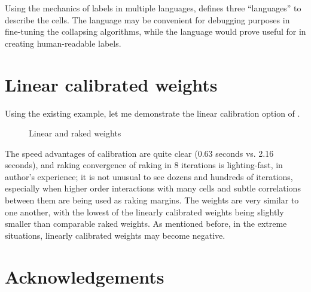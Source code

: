 Using the mechanics of labels in multiple languages,  defines three
``languages'' to describe the cells. The language  may be convenient
for debugging purposes in fine-tuning the collapsing algorithms, while the language
 would prove useful for  in creating human-readable
labels.

\section{Linear calibrated weights}
\label{subsec:linear}

Using the existing example, let me demonstrate the linear calibration option of
.

\begin{stlog}
\nullskip
\end{stlog}

\begin{figure}[h!]
    \begin{center}
    \end{center}
    \caption{Linear and raked weights}
    \label{fig:linear:raked}
\end{figure}

The speed advantages of  calibration are quite clear (0.63 seconds vs. 2.16 seconds), 
and raking convergence of raking in 8 iterations is lighting-fast, in author's experience;
it is not unusual to see dozens and hundreds of iterations, especially when higher order 
interactions with many cells and subtle correlations between them are being used as
raking margins.
The weights are very similar to one another, with the lowest of the linearly
calibrated weights being slightly smaller than comparable raked weights.
As mentioned before, in the extreme situations, linearly calibrated weights
may become negative.


















\section*{Acknowledgements}

